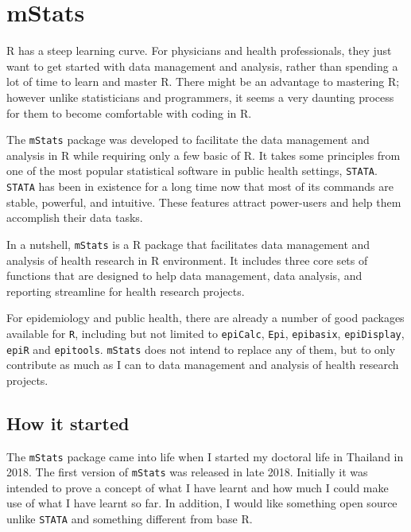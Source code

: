 \documentclass[
]{book}
\begin{document}
\hypertarget{mstats}{%
\section{mStats}\label{mstats}}

R has a steep learning curve. For physicians and health professionals, they just want to get started with data management and analysis, rather than spending a lot of time to learn and master R. There might be an advantage to mastering R; however unlike statisticians and programmers, it seems a very daunting process for them to become comfortable with coding in R.

The \texttt{mStats} package was developed to facilitate the data management and analysis in R while requiring only a few basic of R. It takes some principles from one of the most popular statistical software in public health settings, \texttt{STATA}. \texttt{STATA} has been in existence for a long time now that most of its commands are stable, powerful, and intuitive. These features attract power-users and help them accomplish their data tasks.

In a nutshell, \texttt{mStats} is a R package that facilitates data management and analysis of health research in R environment. It includes three core sets of functions that are designed to help data management, data analysis, and reporting streamline for health research projects.

For epidemiology and public health, there are already a number of good packages available for \texttt{R}, including but not limited to \texttt{epiCalc}, \texttt{Epi}, \texttt{epibasix}, \texttt{epiDisplay}, \texttt{epiR} and \texttt{epitools}. \texttt{mStats} does not intend to replace any of them, but to only contribute as much as I can to data management and analysis of health research projects.

\hypertarget{how-it-started}{%
\subsection{How it started}\label{how-it-started}}

The \texttt{mStats} package came into life when I started my doctoral life in Thailand in 2018. The first version of \texttt{mStats} was released in late 2018. Initially it was intended to prove a concept of what I have learnt and how much I could make use of what I have learnt so far. In addition, I would like something open source unlike \texttt{STATA} and something different from base R.
\end{document}
